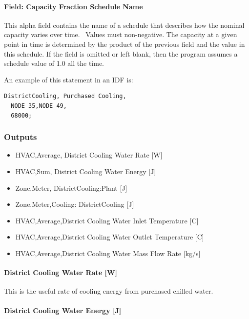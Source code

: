 \paragraph{Field: Capacity Fraction Schedule Name}\label{field-capacity-fraction-schedule-name}

This alpha field contains the name of a schedule that describes how the nominal capacity varies over time.~ Values must non-negative. The capacity at a given point in time is determined by the product of the previous field and the value in this schedule. If the field is omitted or left blank, then the program assumes a schedule value of 1.0 all the time.

An example of this statement in an IDF is:

\begin{lstlisting}
DistrictCooling, Purchased Cooling,
  NODE_35,NODE_49,
  68000;
\end{lstlisting}

\subsubsection{Outputs}\label{outputs-14-003}

\begin{itemize}
    \item
    HVAC,Average, District Cooling Water Rate {[}W{]}
    \item
    HVAC,Sum, District Cooling Water Energy {[}J{]}
    \item
    Zone,Meter, DistrictCooling:Plant {[}J{]}
    \item
    Zone,Meter,Cooling: DistrictCooling {[}J{]}
    \item
    HVAC,Average,District Cooling Water Inlet Temperature {[}C{]}
    \item
    HVAC,Average,District Cooling Water Outlet Temperature {[}C{]}
    \item
    HVAC,Average,District Cooling Water Mass Flow Rate {[}kg/s{]}
\end{itemize}

\paragraph{District Cooling Water Rate {[}W{]}}\label{district-cooling-chilled-water-rate-w}

This is the useful rate of cooling energy from purchased chilled water.

\paragraph{District Cooling Water Energy {[}J{]}}\label{district-cooling-chilled-water-energy-j}

